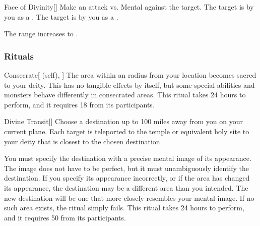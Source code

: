 \lowercase{\hypertarget{spell:Face of Divinity}{}}\label{spell:Face of Divinity}
\begin{freeability}[Rank 6]{\hypertarget{spell:Face of Divinity}{Face of Divinity}}[]
Make an attack vs. Mental against the target.
\hit The target is \shaken by you as a .
\crit The target is  by you as a .

\rankline
{} The range increases to \rnglong.

\end{freeability}
\vspace{0.25em}



\subsubsection{Rituals}


\lowercase{\hypertarget{spell:Consecrate}{}}\label{spell:Consecrate}
\begin{attuneability}[Rank 3]{\hypertarget{spell:Consecrate}{Consecrate}}[ (self), ]
\targetrule
The area within an \arealarge radius  from your location becomes sacred to your deity.
This has no tangible effects by itself, but some special abilities and monsters behave differently in consecrated areas.
This ritual takes 24 hours to perform, and it requires 18  from its participants.
\end{attuneability}
\vspace{0.25em}



\lowercase{\hypertarget{spell:Divine Transit}{}}\label{spell:Divine Transit}
\begin{freeability}[Rank 5]{\hypertarget{spell:Divine Transit}{Divine Transit}}[]
Choose a destination up to 100 miles away from you on your current plane.
Each target is teleported to the temple or equivalent holy site to your deity that is closest to the chosen destination.

You must specify the destination with a precise mental image of its appearance.
The image does not have to be perfect, but it must unambiguously identify the destination.
If you specify its appearance incorrectly, or if the area has changed its appearance, the destination may be a different area than you intended.
The new destination will be one that more closely resembles your mental image.
If no such area exists, the ritual simply fails.
This ritual takes 24 hours to perform, and it requires 50  from its participants.
\end{freeability}
\vspace{0.25em}


